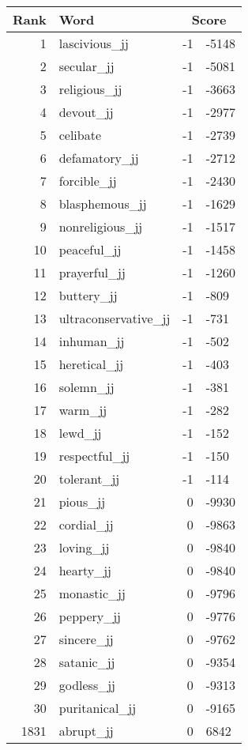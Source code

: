 \begin{longtable}[!htbp]{| rlr@{.}l |}
    \hline
    \textbf{Rank} & \textbf{Word} & \multicolumn{2}{c|}{\textbf{Score}} \\
    \hline
    \endhead
    1 & lascivious\_jj & -1 & -5148 \\
    2 & secular\_jj & -1 & -5081 \\
    3 & religious\_jj & -1 & -3663 \\
    4 & devout\_jj & -1 & -2977 \\
    5 & celibate & -1 & -2739 \\
    6 & defamatory\_jj & -1 & -2712 \\
    7 & forcible\_jj & -1 & -2430 \\
    8 & blasphemous\_jj & -1 & -1629 \\
    9 & nonreligious\_jj & -1 & -1517 \\
    10 & peaceful\_jj & -1 & -1458 \\
    11 & prayerful\_jj & -1 & -1260 \\
    12 & buttery\_jj & -1 & -809 \\
    13 & ultraconservative\_jj & -1 & -731 \\
    14 & inhuman\_jj & -1 & -502 \\
    15 & heretical\_jj & -1 & -403 \\
    16 & solemn\_jj & -1 & -381 \\
    17 & warm\_jj & -1 & -282 \\
    18 & lewd\_jj & -1 & -152 \\
    19 & respectful\_jj & -1 & -150 \\
    20 & tolerant\_jj & -1 & -114 \\
    21 & pious\_jj & 0 & -9930 \\
    22 & cordial\_jj & 0 & -9863 \\
    23 & loving\_jj & 0 & -9840 \\
    24 & hearty\_jj & 0 & -9840 \\
    25 & monastic\_jj & 0 & -9796 \\
    26 & peppery\_jj & 0 & -9776 \\
    27 & sincere\_jj & 0 & -9762 \\
    28 & satanic\_jj & 0 & -9354 \\
    29 & godless\_jj & 0 & -9313 \\
    30 & puritanical\_jj & 0 & -9165 \\
    1831 & abrupt\_jj & 0 & 6842 \\

\end{longtable}

